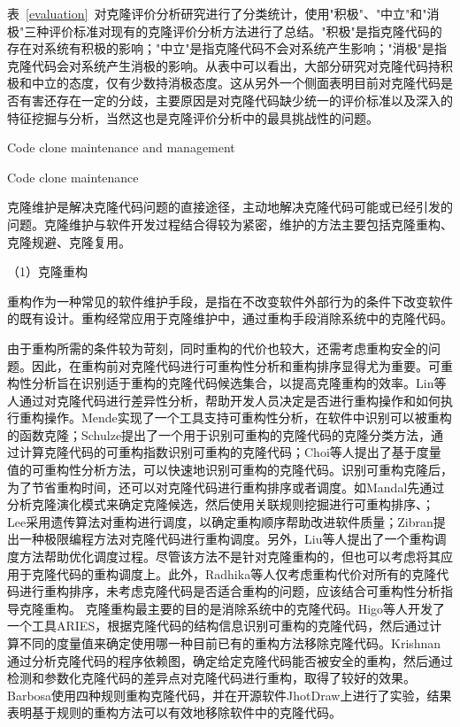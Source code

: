 表~\ref{evaluation}~对克隆评价分析研究进行了分类统计，使用"积极"、"中立"和"消极"三种评价标准对现有的克隆评价分析方法进行了总结。"积极"是指克隆代码的存在对系统有积极的影响；"中立"是指克隆代码不会对系统产生影响；"消极"是指克隆代码会对系统产生消极的影响。从表中可以看出，大部分研究对克隆代码持积极和中立的态度，仅有少数持消极态度。这从另外一个侧面表明目前对克隆代码是否有害还存在一定的分歧，主要原因是对克隆代码缺少统一的评价标准以及深入的特征挖掘与分析，当然这也是克隆评价分析中的最具挑战性的问题。

{Code clone maintenance and management}

{Code clone maintenance}

克隆维护是解决克隆代码问题的直接途径，主动地解决克隆代码可能或已经引发的问题。克隆维护与软件开发过程结合得较为紧密，维护的方法主要包括克隆重构、克隆规避、克隆复用。

（1）克隆重构

重构作为一种常见的软件维护手段，是指在不改变软件外部行为的条件下改变软件的既有设计\cite{kerievsky2006重构与模式}。重构经常应用于克隆维护中，通过重构手段消除系统中的克隆代码。

由于重构所需的条件较为苛刻，同时重构的代价也较大，还需考虑重构安全的问题。因此，在重构前对克隆代码进行可重构性分析和重构排序显得尤为重要。可重构性分析旨在识别适于重构的克隆代码候选集合，以提高克隆重构的效率。Lin等人通过对克隆代码进行差异性分析，帮助开发人员决定是否进行重构操作和如何执行重构操作\cite{lin2014detecting}。Mende实现了一个工具支持可重构性分析，在软件中识别可以被重构的函数克隆\cite{mende2009evaluation}；Schulze提出了一个用于识别可重构的克隆代码的克隆分类方法，通过计算克隆代码的可重构指数识别可重构的克隆代码\cite{schulze2008towards}；Choi等人提出了基于度量值的可重构性分析方法，可以快速地识别可重构的克隆代码\cite{choi2011extracting}。识别可重构克隆后，为了节省重构时间，还可以对克隆代码进行重构排序或者调度。如Mandal先通过分析克隆演化模式来确定克隆候选，然后使用关联规则挖掘进行可重构排序、\cite{mandal2014automatic}；Lee采用遗传算法对重构进行调度，以确定重构顺序帮助改进软件质量\cite{lee2011automated}；Zibran提出一种极限编程方法对克隆代码进行重构调度\cite{zibran2011constraint}。另外，Liu等人提出了一个重构调度方法帮助优化调度过程\cite{liu2012schedule}。尽管该方法不是针对克隆重构的，但也可以考虑将其应用于克隆代码的重构调度上。此外，Radhika等人仅考虑重构代价对所有的克隆代码进行重构排序，未考虑克隆代码是否适合重构的问题\cite{venkatasubramanyam2013prioritizing}，应该结合可重构性分析指导克隆重构。
克隆重构最主要的目的是消除系统中的克隆代码。Higo等人开发了一个工具ARIES，根据克隆代码的结构信息识别可重构的克隆代码，然后通过计算不同的度量值来确定使用哪一种目前已有的重构方法移除克隆代码\cite{higo2008metric}。Krishnan通过分析克隆代码的程序依赖图，确定给定克隆代码能否被安全的重构，然后通过检测和参数化克隆代码的差异点对克隆代码进行重构，取得了较好的效果\cite{krishnan2014unification}。Barbosa使用四种规则重构克隆代码，并在开源软件JhotDraw上进行了实验，结果表明基于规则的重构方法可以有效地移除软件中的克隆代码\cite{barbosa2013removing}。

